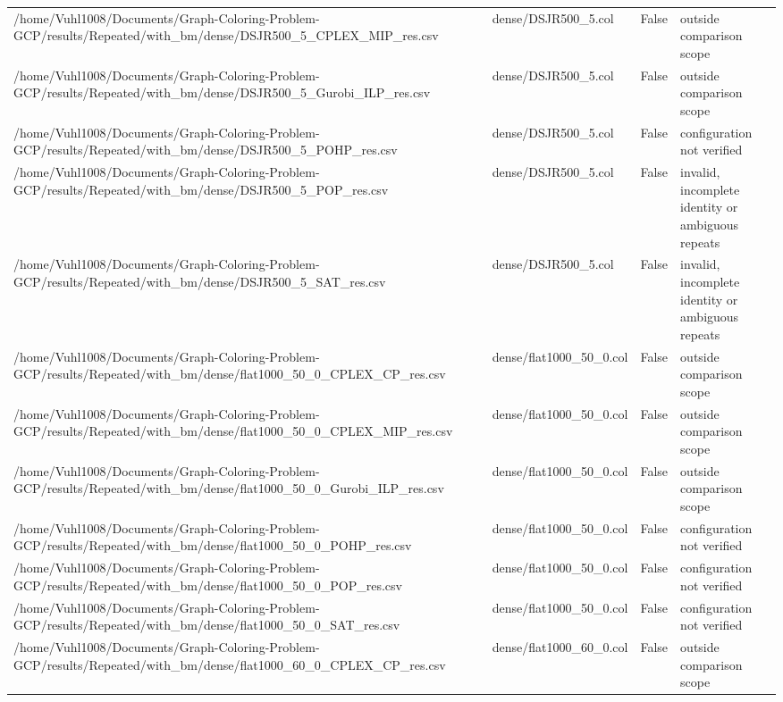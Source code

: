 \begin{table}[htbp]
\begin{tabular}{llll}
/home/Vuhl1008/Documents/Graph-Coloring-Problem-GCP/results/Repeated/with\_bm/dense/DSJR500\_5\_CPLEX\_MIP\_res.csv & dense/DSJR500\_5.col & False & outside comparison scope \\
/home/Vuhl1008/Documents/Graph-Coloring-Problem-GCP/results/Repeated/with\_bm/dense/DSJR500\_5\_Gurobi\_ILP\_res.csv & dense/DSJR500\_5.col & False & outside comparison scope \\
/home/Vuhl1008/Documents/Graph-Coloring-Problem-GCP/results/Repeated/with\_bm/dense/DSJR500\_5\_POHP\_res.csv & dense/DSJR500\_5.col & False & configuration not verified \\
/home/Vuhl1008/Documents/Graph-Coloring-Problem-GCP/results/Repeated/with\_bm/dense/DSJR500\_5\_POP\_res.csv & dense/DSJR500\_5.col & False & invalid, incomplete identity or ambiguous repeats \\
/home/Vuhl1008/Documents/Graph-Coloring-Problem-GCP/results/Repeated/with\_bm/dense/DSJR500\_5\_SAT\_res.csv & dense/DSJR500\_5.col & False & invalid, incomplete identity or ambiguous repeats \\
/home/Vuhl1008/Documents/Graph-Coloring-Problem-GCP/results/Repeated/with\_bm/dense/flat1000\_50\_0\_CPLEX\_CP\_res.csv & dense/flat1000\_50\_0.col & False & outside comparison scope \\
/home/Vuhl1008/Documents/Graph-Coloring-Problem-GCP/results/Repeated/with\_bm/dense/flat1000\_50\_0\_CPLEX\_MIP\_res.csv & dense/flat1000\_50\_0.col & False & outside comparison scope \\
/home/Vuhl1008/Documents/Graph-Coloring-Problem-GCP/results/Repeated/with\_bm/dense/flat1000\_50\_0\_Gurobi\_ILP\_res.csv & dense/flat1000\_50\_0.col & False & outside comparison scope \\
/home/Vuhl1008/Documents/Graph-Coloring-Problem-GCP/results/Repeated/with\_bm/dense/flat1000\_50\_0\_POHP\_res.csv & dense/flat1000\_50\_0.col & False & configuration not verified \\
/home/Vuhl1008/Documents/Graph-Coloring-Problem-GCP/results/Repeated/with\_bm/dense/flat1000\_50\_0\_POP\_res.csv & dense/flat1000\_50\_0.col & False & configuration not verified \\
/home/Vuhl1008/Documents/Graph-Coloring-Problem-GCP/results/Repeated/with\_bm/dense/flat1000\_50\_0\_SAT\_res.csv & dense/flat1000\_50\_0.col & False & configuration not verified \\
/home/Vuhl1008/Documents/Graph-Coloring-Problem-GCP/results/Repeated/with\_bm/dense/flat1000\_60\_0\_CPLEX\_CP\_res.csv & dense/flat1000\_60\_0.col & False & outside comparison scope \\

\end{tabular}
\end{table}
